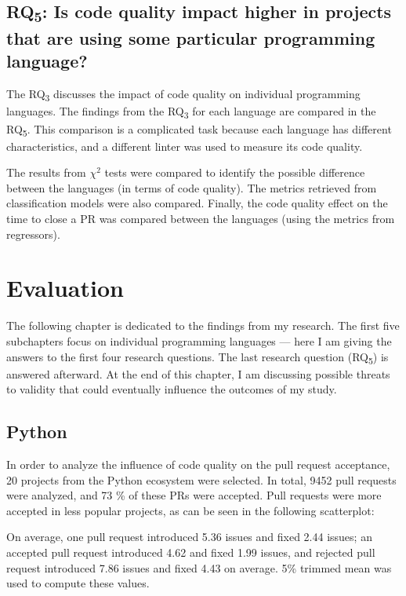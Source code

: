 \documentclass[digital,oneside,oldtable,nolof,nolot,nocover]{fithesis4}
\begin{document}
\section{RQ\textsubscript{5}: Is code quality impact higher in projects that are using some particular programming language?}
\label{sec:org78d836d}
The RQ\textsubscript{3} discusses the impact of code quality on individual
programming languages. The findings from the RQ\textsubscript{3} for each
language are compared in the RQ\textsubscript{5}. This comparison is a complicated
task because each language has different characteristics, and
a different linter was used to measure its code quality.

The results from \(\chi^2\) tests were compared to identify
the possible difference between the languages (in terms of code
quality). The metrics retrieved from classification models were
also compared. Finally, the code quality effect on the time to close a PR
was compared between the languages (using the metrics from regressors).
\chapter{Evaluation}
\label{sec:org502a2ae}
The following chapter is dedicated to the findings from my research.  The first
five subchapters focus on individual programming languages --- here I am
giving the answers to the first four research questions.  The last research
question (RQ\textsubscript{5}) is answered afterward. At the end of this chapter, I am
discussing possible threats to validity that could eventually influence the
outcomes of my study.
\section{Python}
\label{sec:org1e04be8}
In order to analyze the influence of code quality on the pull request
acceptance, 20 projects from the Python ecosystem were selected.
In total, 9452 pull requests were analyzed, and 73 \% of these PRs were accepted.
Pull requests were more accepted in less popular projects, as can be seen in
the following scatterplot:

On average, one pull request introduced 5.36 issues and fixed 2.44 issues;
an accepted pull request introduced 4.62 and fixed 1.99 issues, and rejected
pull request introduced 7.86 issues and fixed 4.43 on average.
5\% trimmed mean was used to compute these values.
\end{document}
